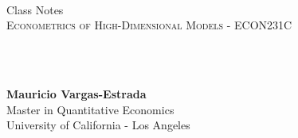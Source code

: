 {
	\parindent0pt
	\ \\ \ \\ \ \\

	\hrulefill
	\vspace{0.0cm}
	\begin{spacing}{1.1}
	{	
		\flushleft
		\fontsize{22pt}{44pt}\selectfont 
		Class Notes
	}\\
	\textsc{Econometrics of High-Dimensional Models - ECON231C}
	\end{spacing}

	\ \\ \ \\
	{
		\textbf{Mauricio Vargas-Estrada}\\
		Master in Quantitative Economics\\
		University of California - Los Angeles\par
	}
	\ \\

	\hrulefill
}
